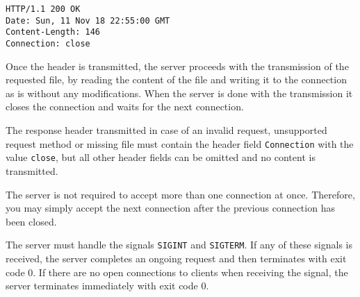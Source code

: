 \begin{verbatim}
HTTP/1.1 200 OK
Date: Sun, 11 Nov 18 22:55:00 GMT
Content-Length: 146
Connection: close
\end{verbatim}

Once the header is transmitted,
the server proceeds with the transmission of the requested file,
by reading the content of the file and writing it to the connection as is
without any modifications.
When the server is done with the transmission it closes the connection
and waits for the next connection.

The response header transmitted in case of an invalid request,
unsupported request method or missing file must contain
the header field \verb|Connection| with the value \verb|close|,
but all other header fields can be omitted and no content is transmitted.

The server is not required to accept more than one connection at once.
Therefore, you may simply accept the next connection
after the previous connection has been closed.

The server must handle the signals \verb|SIGINT| and \verb|SIGTERM|.
If any of these signals is received,
the server completes an ongoing request
and then terminates with exit code 0.
If there are no open connections to clients when receiving the signal,
the server terminates immediately with exit code 0.

\vspace{20mm}

